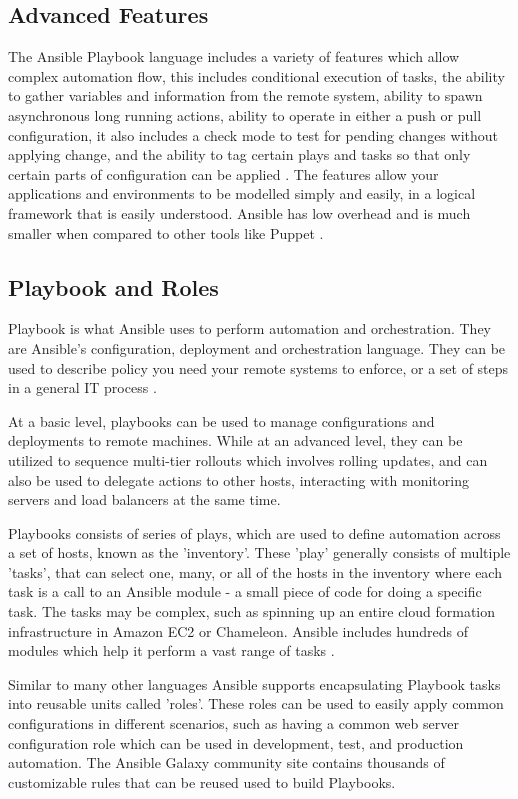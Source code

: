 \documentclass[9pt,twocolumn,twoside]{../../styles/osajnl}
\begin{document}
\subsection{Advanced Features}

The Ansible Playbook language includes a variety of features which
allow complex automation flow, this includes conditional execution of
tasks, the ability to gather variables and information from the remote
system, ability to spawn asynchronous long running actions, ability to
operate in either a push or pull configuration, it also includes a
check mode to test for pending changes without applying change, and
the ability to tag certain plays and tasks so that only certain parts
of configuration can be applied \cite{www-ansible3}. The features
allow your applications and environments to be modelled simply and
easily, in a logical framework that is easily understood. Ansible has
low overhead and is much smaller when compared to other tools like
Puppet \cite{www-ansible4}.

\subsection{Playbook and Roles}

Playbook is what Ansible uses to perform automation and
orchestration. They are Ansible's configuration, deployment and
orchestration language. They can be used to describe policy you need
your remote systems to enforce, or a set of steps in a general IT
process \cite{www-ansible5}.

At a basic level, playbooks can be used to manage configurations and
deployments to remote machines. While at an advanced level, they can
be utilized to sequence multi-tier rollouts which involves rolling
updates, and can also be used to delegate actions to other hosts,
interacting with monitoring servers and load balancers at the same time.

Playbooks consists of series of plays, which are used to define
automation across a set of hosts, known as the 'inventory'. These
'play' generally consists of multiple 'tasks', that can select one,
many, or all of the hosts in the inventory where each task is a call
to an Ansible module - a small piece of code for doing a specific
task. The tasks may be complex, such as spinning up an entire cloud
formation infrastructure in Amazon EC2 or Chameleon. Ansible includes
hundreds of modules which help it perform a vast range of tasks
\cite{www-ansible}.

Similar to many other languages Ansible supports encapsulating
Playbook tasks into reusable units called 'roles'. These roles can be
used to easily apply common configurations in different scenarios,
such as having a common web server configuration role which can be
used in development, test, and production automation. The Ansible
Galaxy community site contains thousands of customizable rules that
can be reused used to build Playbooks.
\end{document}

